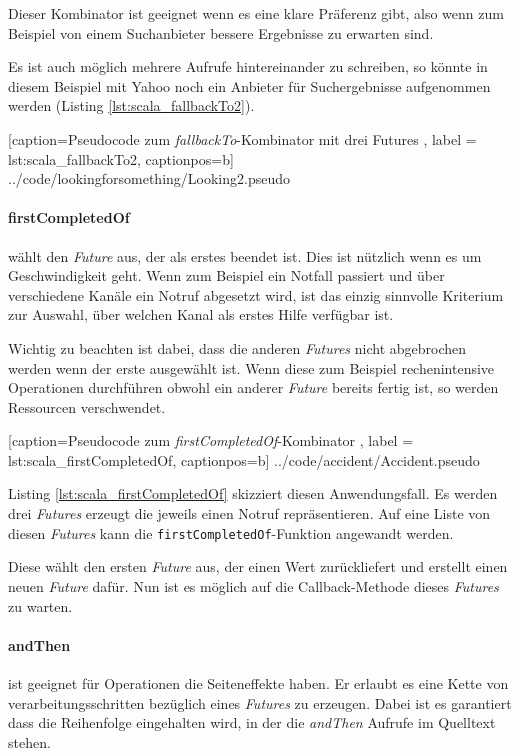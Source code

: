 Dieser Kombinator ist geeignet wenn es eine klare Präferenz gibt,
also wenn zum Beispiel von einem Suchanbieter bessere Ergebnisse
zu erwarten sind.

Es ist auch möglich mehrere Aufrufe hintereinander zu schreiben,
so könnte in diesem Beispiel mit Yahoo noch ein Anbieter für
Suchergebnisse aufgenommen werden (Listing \ref{lst:scala_fallbackTo2}).


    [caption={Pseudocode zum \emph{fallbackTo}-Kombinator mit drei Futures },
       label = lst:scala_fallbackTo2,
       captionpos=b]
 {../code/lookingforsomething/Looking2.pseudo}

\paragraph{firstCompletedOf} wählt den \emph{Future} aus, der als
erstes beendet ist. Dies ist nützlich wenn es um Geschwindigkeit
geht. Wenn zum Beispiel ein Notfall passiert und über verschiedene
Kanäle ein Notruf abgesetzt wird, ist das einzig sinnvolle Kriterium
zur Auswahl, über welchen Kanal als erstes Hilfe verfügbar ist.

Wichtig zu beachten ist dabei, dass die anderen \emph{Futures}
nicht abgebrochen werden wenn der erste ausgewählt ist. Wenn diese
zum Beispiel rechenintensive Operationen durchführen obwohl ein
anderer \emph{Future} bereits fertig ist, so werden Ressourcen
verschwendet.


    [caption={Pseudocode zum \emph{firstCompletedOf}-Kombinator },
       label = lst:scala_firstCompletedOf,
       captionpos=b]
 {../code/accident/Accident.pseudo}
 
Listing \ref{lst:scala_firstCompletedOf} skizziert diesen
Anwendungsfall. Es werden drei \emph{Futures} erzeugt die jeweils
einen Notruf repräsentieren. Auf eine Liste von diesen \emph{Futures}
kann die \texttt{firstCompletedOf}-Funktion angewandt werden.

Diese wählt den ersten \emph{Future} aus, der einen Wert zurückliefert
und erstellt einen neuen \emph{Future} dafür. Nun ist es möglich
auf die Callback-Methode dieses \emph{Futures} zu warten. 

\paragraph{andThen} ist geeignet für Operationen die Seiteneffekte
haben. Er erlaubt es eine Kette von verarbeitungsschritten bezüglich
eines \emph{Futures} zu erzeugen. Dabei ist es garantiert dass
die Reihenfolge eingehalten wird, in der die \emph{andThen} Aufrufe
im Quelltext stehen.

